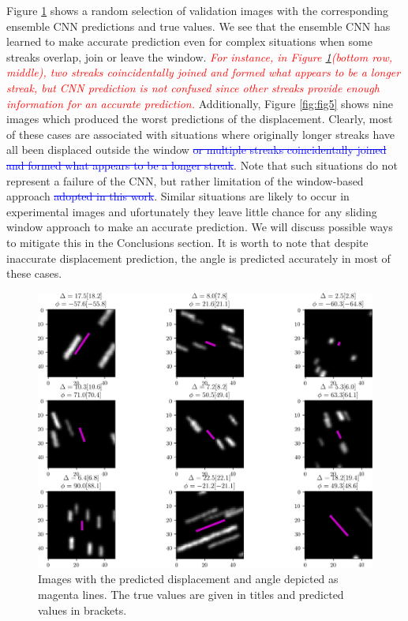 \documentclass{svjour3}                     %
\newcommand{\new}[1]{\textit{\textcolor{red}{#1}}}
\newcommand{\old}[1]{\textcolor{blue}{\sout{#1}}}
\begin{document}
Figure \ref{fig:fig4} shows a random selection of validation images with the corresponding ensemble CNN predictions and true values. We see that the ensemble CNN has learned to make accurate prediction even for complex situations when some streaks overlap, join or leave the window. \new{For instance, in Figure \ref{fig:fig4}(bottom row, middle), two streaks coincidenta\new{l}ly joined and formed what appears to be a longer streak, but CNN prediction is not confused since other streaks provide enough information for an accurate prediction.} Additionally, Figure \ref{fig:fig5} shows nine images which produced the worst predictions of the displacement. Clearly, most of these cases are associated with situations where originally longer streaks have all been displaced outside the window\old{ or multiple streaks coincidentally joined and formed what appears to be a longer streak}. Note that such situations do not represent a failure of the CNN, but rather limitation of the window-based approach\old{ adopted in this work}. Similar situations are likely to occur in experimental images and ufortunately they leave little chance for any sliding window approach to make an accurate prediction. We will discuss possible ways to mitigate this in the Conclusions section. It is worth to note that despite inaccurate displacement prediction, the angle is predicted accurately in most of these cases. 

\begin{figure}
\includegraphics[width=\textwidth]{figs/figure3.png}
\caption{Images with the predicted displacement and angle depicted as magenta lines. The true values are given in titles and predicted values in brackets.}
\label{fig:fig4}
\end{figure}
\end{document}

